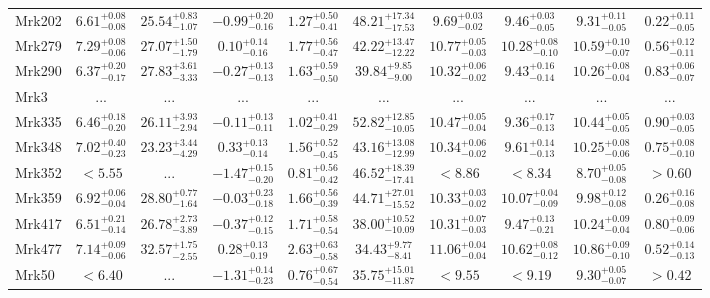 \documentclass[onecolumn]{mn2e}
\begin{document}
\begin{landscape}
{\begin{center}
\begin{longtable}{lccccccccc}
Mrk202 & $6.61_{-0.08}^{+0.08}$ & $25.54_{-1.07}^{+0.83}$ & $-0.99_{-0.16}^{+0.20}$ & $1.27_{-0.41}^{+0.50}$ &$48.21_{-17.53}^{+17.34}$ & $9.69_{-0.02}^{+0.03}$ & $9.46_{-0.05}^{+0.03}$ & $9.31_{-0.05}^{+0.11}$ & $0.22_{-0.05}^{+0.11}$ \\
Mrk279 & $7.29_{-0.06}^{+0.08}$ & $27.07_{-1.79}^{+1.50}$ & $0.10_{-0.16}^{+0.14}$ & $1.77_{-0.47}^{+0.56}$ &$42.22_{-12.22}^{+13.47}$ & $10.77_{-0.03}^{+0.05}$ & $10.28_{-0.10}^{+0.08}$ & $10.59_{-0.07}^{+0.10}$ & $0.56_{-0.11}^{+0.12}$ \\
Mrk290 & $6.37_{-0.17}^{+0.20}$ & $27.83_{-3.33}^{+3.61}$ & $-0.27_{-0.13}^{+0.13}$ & $1.63_{-0.50}^{+0.59}$ &$39.84_{-9.00}^{+9.85}$ & $10.32_{-0.02}^{+0.06}$ & $9.43_{-0.14}^{+0.16}$ & $10.26_{-0.04}^{+0.08}$ & $0.83_{-0.07}^{+0.06}$ \\
Mrk3 & ... & ... & ... & ... &... & ... & ... & ... & ... \\
Mrk335 & $6.46_{-0.20}^{+0.18}$ & $26.11_{-2.94}^{+3.93}$ & $-0.11_{-0.11}^{+0.13}$ & $1.02_{-0.29}^{+0.41}$ &$52.82_{-10.05}^{+12.85}$ & $10.47_{-0.04}^{+0.05}$ & $9.36_{-0.13}^{+0.17}$ & $10.44_{-0.05}^{+0.05}$ & $0.90_{-0.05}^{+0.03}$ \\
Mrk348 & $7.02_{-0.23}^{+0.40}$ & $23.23_{-4.29}^{+3.44}$ & $0.33_{-0.14}^{+0.13}$ & $1.56_{-0.45}^{+0.52}$ &$43.16_{-12.99}^{+13.08}$ & $10.34_{-0.02}^{+0.06}$ & $9.61_{-0.13}^{+0.14}$ & $10.25_{-0.06}^{+0.08}$ & $0.75_{-0.10}^{+0.08}$ \\
Mrk352 & $<5.55$ & ... & $-1.47_{-0.20}^{+0.15}$ & $0.81_{-0.42}^{+0.56}$ &$46.52_{-17.41}^{+18.39}$ & $<8.86$ & $<8.34$ & $8.70_{-0.08}^{+0.05}$ & $>0.60$ \\
Mrk359 & $6.92_{-0.04}^{+0.06}$ & $28.80_{-1.64}^{+0.77}$ & $-0.03_{-0.18}^{+0.23}$ & $1.66_{-0.39}^{+0.56}$ &$44.71_{-15.52}^{+27.01}$ & $10.33_{-0.02}^{+0.03}$ & $10.07_{-0.09}^{+0.04}$ & $9.98_{-0.08}^{+0.12}$ & $0.26_{-0.08}^{+0.16}$ \\
Mrk417 & $6.51_{-0.14}^{+0.21}$ & $26.78_{-3.89}^{+2.73}$ & $-0.37_{-0.15}^{+0.12}$ & $1.71_{-0.54}^{+0.58}$ &$38.00_{-10.09}^{+10.52}$ & $10.31_{-0.03}^{+0.07}$ & $9.47_{-0.21}^{+0.13}$ & $10.24_{-0.04}^{+0.09}$ & $0.80_{-0.06}^{+0.09}$ \\
Mrk477 & $7.14_{-0.06}^{+0.09}$ & $32.57_{-2.55}^{+1.75}$ & $0.28_{-0.19}^{+0.13}$ & $2.63_{-0.58}^{+0.63}$ &$34.43_{-8.41}^{+9.77}$ & $11.06_{-0.04}^{+0.04}$ & $10.62_{-0.12}^{+0.08}$ & $10.86_{-0.10}^{+0.09}$ & $0.52_{-0.13}^{+0.14}$ \\
Mrk50 & $<6.40$ & ... & $-1.31_{-0.23}^{+0.14}$ & $0.76_{-0.54}^{+0.67}$ &$35.75_{-11.87}^{+15.01}$ & $<9.55$ & $<9.19$ & $9.30_{-0.07}^{+0.05}$ & $>0.42$ \\

\end{longtable}
\end{center}}
\end{landscape}
\end{document}
